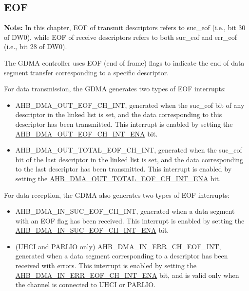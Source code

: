 \documentclass[main\_\_EN.tex]{subfiles}
\begin{document}
\subsection{EOF}

{\bfseries Note: }In this chapter, EOF of transmit descriptors refers to suc\_eof (i.e., bit 30 of DW0), while EOF of receive descriptors refers to both suc\_eof and err\_eof (i.e., bit 28 of DW0).

The GDMA controller uses EOF (end of frame) flags to indicate the end of data segment transfer corresponding to a specific descriptor.

For data transmission, the GDMA generates two types of EOF interrupts:
\begin{itemize}
    \item AHB\_DMA\_OUT\_EOF\_CH\_INT, generated when the suc\_eof bit of any descriptor in the linked list is set, and the data corresponding to this descriptor has been transmitted. This interrupt is enabled by setting the \hyperref[fielddesc:AHBDMAOUTEOFCHNINTENA]{AHB\_DMA\_OUT\_EOF\_CH\_INT\_ENA} bit.
    \item AHB\_DMA\_OUT\_TOTAL\_EOF\_CH\_INT, generated when the suc\_eof bit of the last descriptor in the linked list is set, and the data corresponding to the last descriptor has been transmitted. This interrupt is enabled by setting the \hyperref[fielddesc:AHBDMAOUTTOTALEOFCHNINTENA]{AHB\_DMA\_OUT\_TOTAL\_EOF\_CH\_INT\_ENA} bit.
\end{itemize}

For data reception, the GDMA also generates two types of EOF interrupts:
\begin{itemize}
    \item AHB\_DMA\_IN\_SUC\_EOF\_CH\_INT, generated when a data segment with an EOF flag has been received. This interrupt is enabled by setting the \hyperref[fielddesc:AHBDMAINSUCEOFCHNINTENA]{AHB\_DMA\_IN\_SUC\_EOF\_CH\_INT\_ENA} bit.
    \item (UHCI and PARLIO only) AHB\_DMA\_IN\_ERR\_CH\_EOF\_INT, generated when a data segment corresponding to a descriptor has been received with errors. This interrupt is enabled by setting the \hyperref[fielddesc:AHBDMAINERREOFCHNINTENA]{AHB\_DMA\_IN\_ERR\_EOF\_CH\_INT\_ENA} bit, and is valid only when the channel is connected to UHCI or PARLIO.
\end{itemize}
\end{document}
